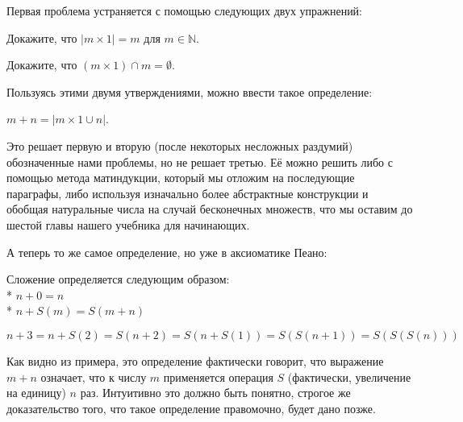 Первая проблема устраняется с помощью следующих двух упражнений:

\begin{exercise}
Докажите, что $|m\times 1| = m$ для $m\in\mathbb{N}$.
\end{exercise}

\begin{exercise}
Докажите, что $(m\times 1) \cap m = \emptyset$.
\end{exercise}

Пользуясь этими двумя утверждениями, можно ввести такое определение:

\begin{definition}
$m + n = |m\times1 \cup n|$.
\end{definition}

Это решает первую и вторую (после некоторых несложных раздумий) обозначенные нами проблемы, но не решает третью. Её можно решить либо с помощью метода матиндукции, который мы отложим на последующие параграфы, либо используя изначально более абстрактные конструкции и обобщая натуральные числа на случай бесконечных множеств, что мы оставим до шестой главы нашего учебника для начинающих.

А теперь то же самое определение, но уже в аксиоматике Пеано:

\begin{definition}
Сложение определяется следующим образом:\\*
$n + 0 = n$\\*
$n + S(m) = S(m + n)$
\end{definition}

\begin{example}
$$n + 3 = n + S(2) = S(n+2) 
=S(n+S(1)) = S(S(n+1)) = S(S(S(n)))$$
\end{example}

Как видно из примера, это определение фактически говорит, что выражение $m + n$ означает, что к числу $m$ применяется операция $S$ (фактически, увеличение на единицу) $n$ раз. Интуитивно это должно быть понятно, строгое же доказательство того, что такое определение правомочно, будет дано позже.

